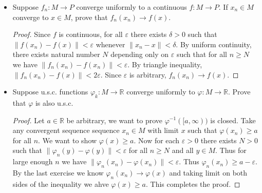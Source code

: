 \begin{itemize}
\begin{proof}
	Now we show $f^{-1} (0) = E \cup \partial E$. First we show $f^{-1} (0) \subset  E \cup \partial E$. Take $x \in M \setminus E$ such that $f(x) = 0$. Then for each $n$ there exists $x_n \in E$ such that $\rho(x, x_n) < \frac{1}{n}$. This shows $x \in \partial E$. On the other direction, suppose $x \in E \in \partial E$. If $x \in E$ then the claim is trivial. If $x \in \partial E$ then there exists a sequence of elements in $E$ converging to $x$, so again we have $f(x) = 0$.
\end{proof}
\item Suppose $f_n: M \to  P$ converge uniformly to a continuous $f: M \to  P$. If $x_n \in M$ converge to $x \in M$, prove that $f_n(x_n) \to f(x)$.
\begin{proof}
	Since $f$ is continuous, for all $\varepsilon$ there exists $\delta>0$ such that $\|f(x_n) - f(x)\| < \varepsilon$ whenever $\|x_n - x\|<\delta$. By uniform continuity, there exists natural number $N$ depending only on $\varepsilon$ such that for all $n \ge N$ we have $\|f_n(x_n) - f(x_n)\|<\varepsilon$. By triangle inequality, $\|f_n(x_n) - f(x)\|< 2 \varepsilon$. Since $\varepsilon$ is arbitrary, $f_n(x_n) \to f(x)$.
\end{proof}
\item Suppose u.s.c. functions $\varphi_k:M \to \mathbb{R}$ converge uniformly to $\varphi: M \to \mathbb{R}$. Prove that $\varphi$ is also u.s.c.
\begin{proof}
	Let $a \in \mathbb{R}$ be arbitrary, we want to prove $\varphi^{-1} ([a, \infty ))$ is closed. Take any convergent sequence sequence $x_n \in M$ with limit $x$ such that $\varphi(x_n) \ge a$ for all $n$. We want to show $\varphi(x) \ge a$. Now for each $\varepsilon>0$ there exists $N>0$ such that $\|\varphi_n(y) - \varphi(y)\|<\varepsilon$ for all $n \ge N$ and all $y \in M$. Thus for large enough $n$ we have $\|\varphi_n(x_n) - \varphi(x_n)\|<\varepsilon$. Thus $\varphi_n(x_n) \ge a - \varepsilon$. By the last exercise we know $\varphi_n(x_n) \to \varphi(x)$ and taking limit on both sides of the inequality we ahve $\varphi(x) \ge a$. This completes the proof.
\end{proof}


\end{itemize}
